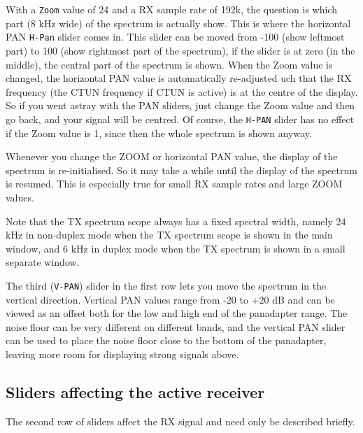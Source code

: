 \documentclass[12pt]{book}
\def\rett#1{\texttt{\color{red}#1}}
\def\bltt#1{\texttt{\color{blue}#1}}
\begin{document}
With a \bltt{Zoom} value of 24 and a RX sample rate of 192k,
the question is which part (8 kHz wide) of the spectrum is actually
show. This is where the horizontal PAN \rett{H-Pan} slider comes in.
This slider can be moved from -100 (show leftmost part) to
100 (show rightmost part of the spectrum), if the slider is 
at zero (in the middle), the central part of the spectrum is
shown. When the Zoom value is changed, the horizontal
PAN value is automatically re-adjusted 
uch that the RX frequency
(the CTUN frequency if CTUN is active) is at the
centre of the display. So if you went astray with the
PAN sliders, just change the Zoom value and then go
back, and your signal will be centred. Of course, the
\rett{H-PAN} slider has no effect if the Zoom value
is 1, since then the whole spectrum is shown anyway.

Whenever you change the ZOOM or horizontal PAN value, the display of the
spectrum is re-initialised. So it may take a while until the
display of the spectrum is resumed. This is especially true
for small RX sample rates and large ZOOM values.

Note that the TX spectrum scope always has a fixed spectral
width, namely 24 kHz in non-duplex mode when the TX spectrum
scope is shown in the main window, and 6 kHz in duplex mode
when the TX spectrum is shown in a small separate window.

The third (\rett{V-PAN}) slider in the first row lets you move the
spectrum in the vertical direction. Vertical PAN values range from
-20 to +20 dB and can be viewed as an offset both for the low and high
end of the panadapter range. The noise floor can be very different
on different bands, and the vertical PAN slider can be used to place
the noise floor close to the bottom of the panadapter, leaving more
room for displaying strong signals above.

\subsection{Sliders affecting the active receiver}
The second row of sliders affect the RX signal and need only be described briefly.
\end{document}
